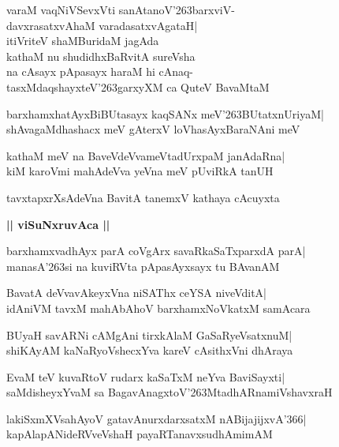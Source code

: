 \documentclass[twoside,12pt,openright]{book}
\def\S{\char'263}
\newcounter{shloka}[chapter]
\def\uvaca#1{\centerline{{\large\textbf{#1}}}}
\begin{document}
\begin{shloka}%
varaM vaqNiVSevxVti sanAtanoV\S barxviV-\\
davxrasatxvAhaM varadasatxvAgataH|\\
itiVriteV shaMBuridaM jagAda\\
kathaM nu shudidhxBaRvitA sureVsha\\
na cAsayx pApasayx haraM hi cAnaq-\\
tasxMdaqshayxteV\S garxyXM ca QuteV BavaMtaM
\end{shloka}

\begin{shloka}%
barxhamxhatAyxBiBUtasayx kaqSANx meV\S BUtatxnUriyaM|\\
shAvagaMdhashacx meV gAterxV loVhasAyxBaraNAni meV
\end{shloka}

\begin{shloka}%
kathaM meV na BaveVdeVvameVtadUrxpaM janAdaRna|\\
kiM karoVmi mahAdeVva yeVna meV pUviRkA tanUH
\end{shloka}

\begin{shloka}%
tavxtapxrXsAdeVna BavitA tanemxV kathaya cAcuyxta
\end{shloka}

\uvaca{|| viSuNxruvAca ||}
\begin{shloka}%
barxhamxvadhAyx parA coVgArx savaRkaSaTxparxdA parA|\\
manasA\S si na kuviRVta pApasAyxsayx tu BAvanAM
\end{shloka}

\begin{shloka}%
BavatA deVvavAkeyxVna niSAThx ceYSA niveVditA|\\
idAniVM tavxM mahAbAhoV barxhamxNoVkatxM samAcara
\end{shloka}

\begin{shloka}%
BUyaH savARNi cAMgAni tirxkAlaM GaSaRyeVsatxnuM|\\
shiKAyAM kaNaRyoVshecxYva kareV cAsithxVni dhAraya
\end{shloka}

\begin{shloka}%
EvaM teV kuvaRtoV rudarx kaSaTxM neYva BaviSayxti|\\
saMdisheyxYvaM sa BagavAnagxtoV\S MtadhARnamiVshavxraH
\end{shloka}

\begin{shloka}%
lakiSxmXVsahAyoV gatavAnurxdarxsatxM nABijajijxvA\char'366|\\
kapAlapANideRVveVshaH payaRTanavxsudhAmimAM
\end{shloka}
\end{document}
